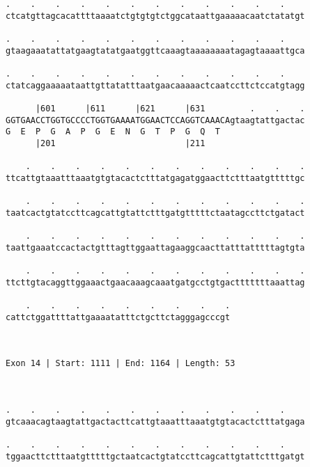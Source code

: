 \documentclass{article}
\begin{document}
\begin{Verbatim}
.    .    .    .    .    .    .    .    .    .    .    .    
ctcatgttagcacattttaaaatctgtgtgtctggcataattgaaaaacaatctatatgt
                                                            
.    .    .    .    .    .    .    .    .    .    .    .    
gtaagaaatattatgaagtatatgaatggttcaaagtaaaaaaaatagagtaaaattgca
                                                            
.    .    .    .    .    .    .    .    .    .    .    .    
ctatcaggaaaaataattgttatatttaatgaacaaaaactcaatccttctccatgtagg
                                                            
      |601      |611      |621      |631         .    .    .
GGTGAACCTGGTGCCCCTGGTGAAAATGGAACTCCAGGTCAAACAgtaagtattgactac
G  E  P  G  A  P  G  E  N  G  T  P  G  Q  T                 
      |201                          |211                    
  
    .    .    .    .    .    .    .    .    .    .    .    .
ttcattgtaaatttaaatgtgtacactctttatgagatggaacttctttaatgtttttgc
                                                            
    .    .    .    .    .    .    .    .    .    .    .    .
taatcactgtatccttcagcattgtattctttgatgtttttctaatagccttctgatact
                                                            
    .    .    .    .    .    .    .    .    .    .    .    .
taattgaaatccactactgtttagttggaattagaaggcaacttatttatttttagtgta
                                                            
    .    .    .    .    .    .    .    .    .    .    .    .
ttcttgtacaggttggaaactgaacaaagcaaatgatgcctgtgactttttttaaattag
                                                            
    .    .    .    .    .    .    .    .    .
cattctggattttattgaaaatatttctgcttctagggagcccgt
                                             
                                             
 
Exon 14 | Start: 1111 | End: 1164 | Length: 53



.    .    .    .    .    .    .    .    .    .    .    .    
gtcaaacagtaagtattgactacttcattgtaaatttaaatgtgtacactctttatgaga
                                                            
.    .    .    .    .    .    .    .    .    .    .    .    
tggaacttctttaatgtttttgctaatcactgtatccttcagcattgtattctttgatgt
                                                            

\end{Verbatim}
\end{document}
